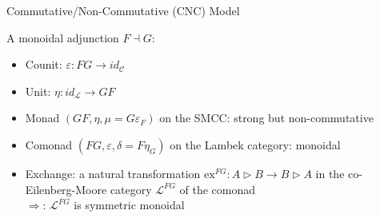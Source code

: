\documentclass{beamer}
\begin{document}
\begin{frame}{Commutative/Non-Commutative (CNC) Model}

A monoidal adjunction $F\dashv G$:
\begin{itemize}
\item Counit: $\varepsilon:FG\rightarrow id_\mathcal{C}$
\item Unit: $\eta:id_\mathcal{L}\rightarrow GF$
\end{itemize}

\begin{center}
\end{center}

\begin{block}{}
\begin{itemize}
\item Monad $(GF,\eta,\mu=G\varepsilon_F)$ on the SMCC: strong but
      non-commutative
\item Comonad $(FG,\varepsilon,\delta=F\eta_G)$ on the Lambek category:
      monoidal
\item Exchange: a natural transformation
      $\mathrm{ex}^{FG}:A\triangleright B\rightarrow B\triangleright A$ in
      the co-Eilenberg-Moore category $\mathcal{L}^{FG}$ of the comonad \\
      $\Rightarrow$: $\mathcal{L}^{FG}$ is symmetric monoidal 
\end{itemize}
\end{block}

\end{frame}
\end{document}
